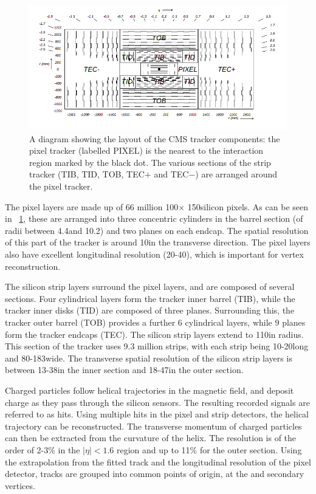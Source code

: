 \begin{figure}[h]
\centering
\includegraphics[width=1.0\textwidth]{detectorFigures/trackerSchematic.png}
\caption{A diagram showing the layout of the CMS tracker components: the pixel tracker (labelled PIXEL) is the nearest to the interaction region marked by the black dot. The various sections of the strip tracker (TIB, TID, TOB, TEC$+$ and TEC$-$) are arranged around the pixel tracker\quad\cite{CMSTDR}.}
\label{fig:trk}
\end{figure}

The pixel layers are made up of 66 million 100\um $\times$ 150\um silicon pixels. As can be seen in \Fig~\ref{fig:trk}, these are arranged into three concentric cylinders in the barrel section (of radii between 4.4\cm and 10.2\cm) and two planes on each endcap. The spatial resolution of this part of the tracker is around 10\um in the transverse direction. The pixel layers also have excellent longitudinal resolution (20-40\um), which is important for vertex reconstruction.~\cite{trackerperformance2014}

The silicon strip layers surround the pixel layers, and are composed of several sections. Four cylindrical layers form the tracker inner barrel (TIB), while the tracker inner disks (TID) are composed of three planes. Surrounding this, the tracker outer barrel (TOB) provides a further 6 cylindrical layers, while 9 planes form the tracker endcaps (TEC). The silicon strip layers extend to 110\cm in radius. This section of the tracker uses 9.3 million strips, with each strip being 10-20\cm long and 80-183\um wide. The transverse spatial resolution of the silicon strip layers is between 13-38\um in the inner section and 18-47\um in the outer section.~\cite{trackerperformance2014}

Charged particles follow helical trajectories in the \CMS magnetic field, and deposit charge as they pass through the silicon sensors. The resulting recorded signals are referred to as hits. Using multiple hits in the pixel and strip detectors, the helical trajectory can be reconstructed. The transverse momentum \pT of charged particles can then be extracted from the curvature of the helix. The \pT resolution is of the order of 2-3\% in the $|\eta|<1.6$ region and up to 11\% for the outer section. Using the extrapolation from the fitted track and the longitudinal resolution of the pixel detector, tracks are grouped into common points of origin, at the \PV and secondary vertices. 

